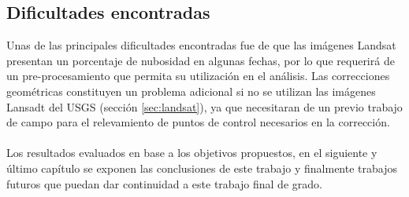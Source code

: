 \subsection{Dificultades encontradas} 
Unas de las principales dificultades encontradas fue de que las im\'agenes Landsat presentan un porcentaje de nubosidad en algunas fechas, por lo que requerir\'a de un pre-procesamiento que permita su utilizaci\'on en el an\'alisis. Las correcciones geom\'etricas constituyen un problema adicional si no se utilizan las im\'agenes Lansadt del USGS (secci\'on \ref{sec:landsat}), ya que necesitaran de un previo trabajo de campo para el relevamiento de puntos de control necesarios en la correcci\'on.\\~\\
Los resultados evaluados en base a los objetivos propuestos, en el siguiente y \'ultimo cap\'itulo se exponen las conclusiones de este trabajo  y finalmente trabajos futuros que puedan dar continuidad a este trabajo final de grado.